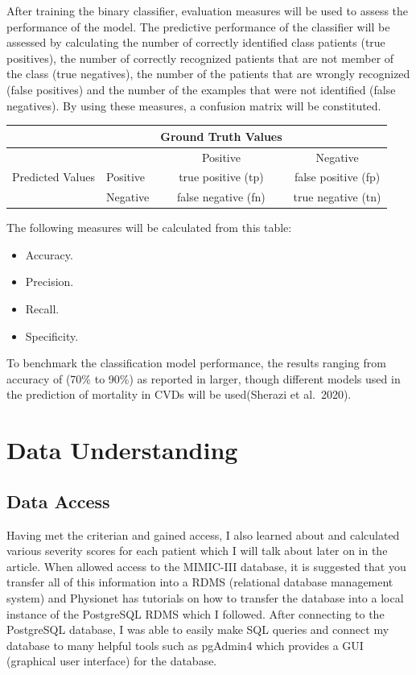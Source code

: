 \documentclass[
]{article}
\providecommand{\tightlist}{%
  \setlength{\itemsep}{0pt}\setlength{\parskip}{0pt}}
\begin{document}
After training the binary classifier, evaluation measures will be used
to assess the performance of the model. The predictive performance of
the classifier will be assessed by calculating the number of correctly
identified class patients (true positives), the number of correctly
recognized patients that are not member of the class (true negatives),
the number of the patients that are wrongly recognized (false positives)
and the number of the examples that were not identified (false
negatives). By using these measures, a confusion matrix will be
constituted.

\begin{longtable}[]{@{}clcc@{}}
\toprule
& & Ground Truth Values & \\
\midrule
\endhead
& & Positive & Negative \\
Predicted Values & Positive & true positive (tp) & false positive
(fp) \\
& Negative & false negative (fn) & true negative (tn) \\
\bottomrule
\end{longtable}

The following measures will be calculated from this table:

\begin{itemize}
\tightlist
\item
  Accuracy.
\item
  Precision.
\item
  Recall.
\item
  Specificity.
\end{itemize}

To benchmark the classification model performance, the results ranging
from accuracy of (70\% to 90\%) as reported in larger, though different
models used in the prediction of mortality in CVDs will be used(Sherazi
et al.~2020).

\hypertarget{data-understanding}{%
\section{Data Understanding}\label{data-understanding}}

\hypertarget{data-access}{%
\subsection{Data Access}\label{data-access}}

Having met the criterian and gained access, I also learned about and
calculated various severity scores for each patient which I will talk
about later on in the article. When allowed access to the MIMIC-III
database, it is suggested that you transfer all of this information into
a RDMS (relational database management system) and Physionet has
tutorials on how to transfer the database into a local instance of the
PostgreSQL RDMS which I followed. After connecting to the PostgreSQL
database, I was able to easily make SQL queries and connect my database
to many helpful tools such as pgAdmin4 which provides a GUI (graphical
user interface) for the database.
\end{document}
